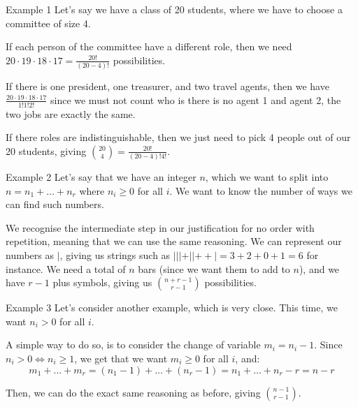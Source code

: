 \documentclass[a4paper]{article}
\begin{document}
\begin{parag}{Example 1}
    Let's say we have a class of 20 students, where we have to choose a committee of size 4. 

    If each person of the committee have a different role, then we need $20\cdot 19\cdot 18\cdot 17 = \frac{20!}{\left(20-4\right)!}$ possibilities.

    If there is one president, one treasurer, and two travel agents, then we have $\frac{20\cdot 19\cdot 18\cdot 17}{1!1!2!}$ since we must not count who is there is no agent 1 and agent 2, the two jobs are exactly the same.

    If there roles are indistinguishable, then we just need to pick 4 people out of our 20 students, giving $\binom{20}{4} = \frac{20!}{\left(20-4\right)!4!}$.
\end{parag}

\begin{parag}{Example 2}
    Let's say that we have an integer $n$, which we want to split into $n= n_1 + \ldots + n_r$ where $n_i \geq 0$ for all $i$. We want to know the number of ways we can find such numbers.

    We recognise the intermediate step in our justification for no order with repetition, meaning that we can use the same reasoning. We can represent our numbers as $|$, giving us strings such as $|||+||++| = 3 + 2 + 0 + 1 = 6$ for instance. We need a total of $n$ bars (since we want them to add to $n$), and we have $r-1$ plus symbols, giving us $\binom{n+r-1}{r-1}$ possibilities.
\end{parag}

\begin{parag}{Example 3}
    Let's consider another example, which is very close. This time, we want $n_i > 0$ for all $i$. 

    A simple way to do so, is to consider the change of variable $m_i = n_i - 1$. Since $n_i > 0 \iff n_i \geq 1$, we get that we want $m_i \geq 0$ for all $i$, and:
    \[m_1 + \ldots + m_r = \left(n_1 - 1\right) + \ldots + \left(n_r - 1\right) = n_1 + \ldots + n_r - r = n - r\]

    Then, we can do the exact same reasoning as before, giving $\binom{n-1}{r-1}$.
\end{parag}
\end{document}
